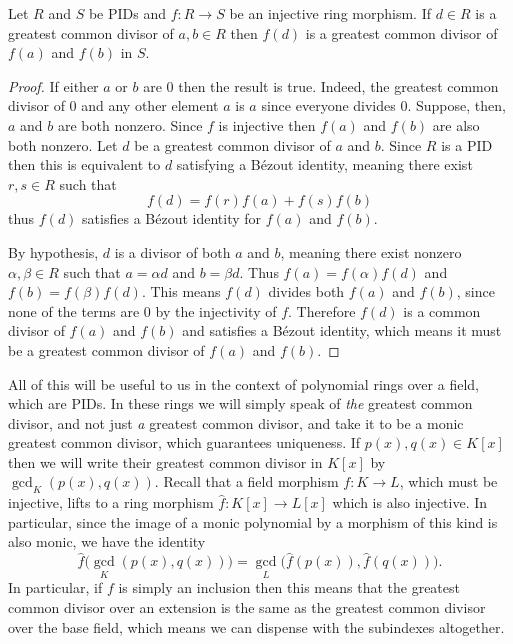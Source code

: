 \documentclass[12pt,oneside]{book}
\begin{document}
\begin{lemma}
	Let \( R \) and \( S \) be PIDs and \( f \colon R \to S \) be an injective ring
	morphism. If \( d \in R \) is a greatest common divisor of \( a,b \in R \) then \( f(d)
	\) is a greatest common divisor of \( f(a) \) and \( f(b) \) in \( S \).
\end{lemma}
\begin{proof}
	If either \( a \) or \( b \) are 0 then the result is true. Indeed, the greatest common
	divisor of 0 and any other element \( a \) is \( a \) since everyone divides 0. 
	Suppose, then, \( a \) and \( b \) are both nonzero. Since \( f \) is injective then \(
	f(a) \) and \( f(b) \) are also both nonzero. Let \( d \) be a greatest common divisor
	of \( a \) and \( b \).	Since \( R \) is a PID then this is equivalent to \( d \)
	satisfying a Bézout identity, meaning there exist \( r, s \in R \) such that
	\begin{equation*}
		f(d) = f(r)f(a) + f(s)f(b) 
	\end{equation*}
	thus \( f(d) \) satisfies a Bézout identity for \( f(a) \) and \( f(b) \).
	
	By hypothesis, \( d \) is a divisor of both \( a \) and \( b \), meaning there exist
	nonzero \( \alpha, \beta	\in R \) such that \( a = \alpha d \) and \( b = \beta d \).
	Thus \( f(a) =f(\alpha)f(d) \) and \( f(b) = f(\beta)f(d) \). This means \( f(d) \)
	divides both \(	f(a) \) and \( f(b) \), since none of the terms are 0 by the injectivity
	of \( f \). Therefore \( f(d) \) is a common divisor of \( f(a) \) and \( f(b) \) and
	satisfies a Bézout identity, which means it must be a greatest common divisor of \( f(a)
	\) and \( f(b) \).
\end{proof}

\parbreak

All of this will be useful to us in the context of polynomial rings over a field, which
are PIDs. In these rings we will simply speak of \emph{the} greatest common divisor, and
not just \emph{a} greatest common divisor, and take it to be a monic greatest common
divisor, which guarantees uniqueness. If \( p(x), q(x) \in K[x] \) then we will write
their greatest common divisor in \( K[x] \) by \( {\gcd}_K(p(x), q(x)) \). Recall that
a field morphism \( f \colon K \to L \), which must be injective, lifts to a ring morphism
\( \hat{f} \colon K[x] \to L[x] \) which is also injective. In particular, since the image
of a monic polynomial by a morphism of this kind is also monic, we have the identity
\begin{equation*}
	\hat{f}\big({\gcd}_K(p(x), q(x))\big) = {\gcd}_L\big(\hat{f}(p(x)), \hat{f}(q(x))\big).
\end{equation*}
In particular, if \( f \) is simply an inclusion then this means that the greatest common
divisor over an extension is the same as the greatest common divisor over the base field,
which means we can dispense with the subindexes altogether.
\end{document}
